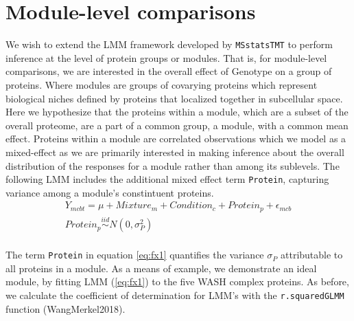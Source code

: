 \documentclass[11pt]{elife}\usepackage[]{graphicx}\usepackage[]{color}
\begin{document}
\section{Module-level comparisons}

We wish to extend the LMM framework developed by \texttt{MSstatsTMT} to perform 
inference at the level of protein groups or modules.
That is, for module-level comparisons, we are interested in the overall effect 
of Genotype on a group of proteins. Where modules are groups of covarying 
proteins which represent biological niches defined by proteins that 
localized together in subcellular space.\\

Here we hypothesize that the proteins within a module, which are a subset of the
overall proteome,  are a part of a common group, a module, with a common mean
effect. Proteins within a module are correlated observations which we model as a
mixed-effect as we are primarily interested in making inference about the
overall distribution of the responses for a module rather than among its
sublevels. The following LMM includes the additional mixed effect term
\texttt{Protein}, capturing variance among a module's constintuent proteins.
\begin{equation} 
  \begin{gathered}\label{eq:fx1} %
	Y_{mcbt} = \mu + Mixture_m + Condition_c + Protein_p + \epsilon_{mcb}\\
	Protein_p \stackrel{iid}{\sim} N(0,\sigma^2_P) \\
  \end{gathered}
\end{equation}

The term \texttt{Protein} in equation \ref{eq:fx1} quantifies the variance
$\sigma_P$ attributable to all proteins in a module.  As a means of example, we
demonstrate an ideal module, by fitting LMM (\ref{eq:fx1}) to the five WASH
complex proteins.  As before, we calculate the coefficient of determination for
LMM's with the \texttt{r.squaredGLMM} function (WangMerkel2018).\\


%
%
%
%
\end{document}
